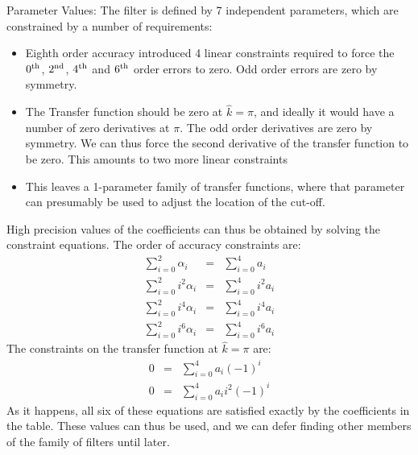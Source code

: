 Parameter Values: The filter is defined by 7 independent
parameters, which are constrained by a number of requirements:
\begin{itemize}
\item Eighth order accuracy introduced 4 linear constraints required to
      force the $0^{\rm th}$, $2^{\rm nd}$, $4^{\rm th}$ and $6^{\rm
      th}$
      order errors to zero. Odd order errors are zero by symmetry.
\item The Transfer function should be zero at $\hat k=\pi$, and ideally
      it would have a number of zero derivatives at $\pi$. The odd order
      derivatives are zero by symmetry. We can thus force the second
      derivative of the transfer function to be zero. This amounts to
      two more linear constraints
\item This leaves a 1-parameter family of transfer functions, where that
      parameter can presumably be used to adjust the location of the
      cut-off.
\end{itemize}
High precision values of the coefficients can thus be obtained by
solving the constraint equations. The order of accuracy constraints are:
\begin{eqnarray}
\sum_{i=0}^2\alpha_i&=&\sum_{i=0}^4a_i\\
\sum_{i=0}^2i^2\alpha_i&=&\sum_{i=0}^4i^2a_i\\
\sum_{i=0}^2i^4\alpha_i&=&\sum_{i=0}^4i^4a_i\\
\sum_{i=0}^2i^6\alpha_i&=&\sum_{i=0}^4i^6a_i
\end{eqnarray}
The constraints on the transfer function at $\hat k=\pi$ are:
\begin{eqnarray}
0&=&\sum_{i=0}^4a_i(-1)^i\\
0&=&\sum_{i=0}^4a_i i^2 (-1)^i
\end{eqnarray}
As it happens, all six of these equations are satisfied exactly by the
coefficients in the table. These values can thus be used, and we can defer finding other
members of the family of filters until later.

